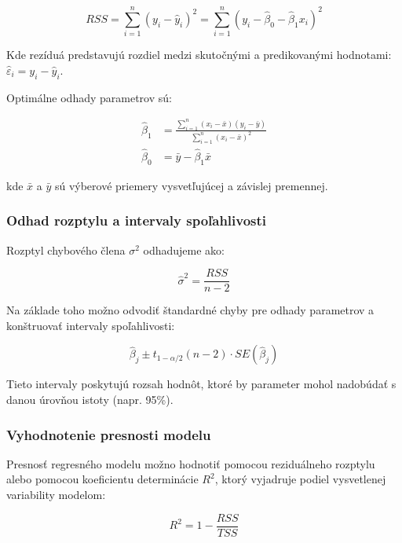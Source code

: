 \begin{equation}
RSS = \sum_{i=1}^{n} \left( y_i - \hat{y}_i \right)^2 = \sum_{i=1}^{n} \left( y_i - \hat{\beta}_0 - \hat{\beta}_1 x_i \right)^2
\end{equation}

Kde rezíduá predstavujú rozdiel medzi skutočnými a predikovanými hodnotami: $\hat{\varepsilon}_i = y_i - \hat{y}_i$.

Optimálne odhady parametrov sú:

\begin{align}
\hat{\beta}_1 &= \frac{\sum_{i=1}^{n}(x_i - \bar{x})(y_i - \bar{y})}{\sum_{i=1}^{n}(x_i - \bar{x})^2} \\
\hat{\beta}_0 &= \bar{y} - \hat{\beta}_1 \bar{x}
\end{align}

kde $\bar{x}$ a $\bar{y}$ sú výberové priemery vysvetľujúcej a závislej premennej.

\subsubsection{Odhad rozptylu a intervaly spoľahlivosti}

Rozptyl chybového člena $\sigma^2$ odhadujeme ako:

\begin{equation}
\hat{\sigma}^2 = \frac{RSS}{n - 2}
\end{equation}

Na základe toho možno odvodiť štandardné chyby pre odhady parametrov a konštruovať intervaly spoľahlivosti:

\begin{equation}
\hat{\beta}_j \pm t_{1 - \alpha/2}(n - 2) \cdot SE(\hat{\beta}_j)
\end{equation}

Tieto intervaly poskytujú rozsah hodnôt, ktoré by parameter mohol nadobúdať s danou úrovňou istoty (napr. 95\%).

\subsubsection{Vyhodnotenie presnosti modelu}

Presnosť regresného modelu možno hodnotiť pomocou reziduálneho rozptylu alebo pomocou koeficientu determinácie $R^2$, ktorý vyjadruje podiel vysvetlenej variability modelom:

\begin{equation}
R^2 = 1 - \frac{RSS}{TSS}
\end{equation}

